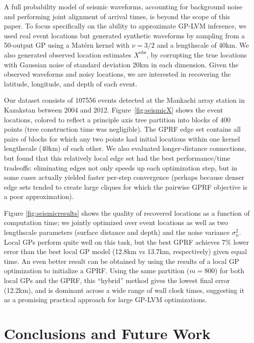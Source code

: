 \documentclass{article}
\begin{document}
A full probability model of seismic waveforms, accounting for background
noise and performing joint alignment of arrival times, is beyond the scope of this
paper. To focus specifically on the ability to approximate GP-LVM inference, we
used real event locations but generated synthetic waveforms  by sampling from a 50-output GP using a Mat\'ern kernel
\cite{rasmussen2006} with $\nu=3/2$ and a lengthscale of 40km. We also
generated observed location estimates $X^\text{obs}$, by corrupting the
true locations with Gaussian noise of standard deviation
20km in each dimension. Given the
observed waveforms and noisy locations, we are interested in recovering the
latitude, longitude, and depth of each event.

Our dataset consists of 107556 events detected at the Mankachi array
station in Kazakstan between 2004 and 2012. Figure~\ref{fig:seismicX}
shows the event locations, colored to reflect a principle axis tree
\cite{mcnames2001fast} partition into blocks of $400$ points (tree construction time was
negligible). The GPRF edge set contains all pairs of
blocks for which any two points had initial locations within one
kernel lengthscale (40km) of each other. We also evaluated
longer-distance connections, but found that this relatively local
edge set had the best performance/time tradeoffs: eliminating edges not
only speeds up each optimization step, but in some cases actually
yielded faster per-step convergence (perhaps because denser edge sets
tended to create large cliques for which the pairwise GPRF objective is
a poor approximation).

Figure \ref{fig:seismicresults} shows the quality of recovered locations as a
function of computation time; we jointly optimized over event locations as
well as two lengthscale parameters (surface distance
and depth) and the noise variance $\sigma^2_n$. Local GPs 
perform quite well on this task, but the best
GPRF achieves 7\% lower error than the best local
GP model (12.8km vs 13.7km, respectively) given equal time. An even
better result can be obtained by using the results of a local GP
optimization to initialize a GPRF. Using the same
partition ($m=800$) for both local GPs and the GPRF, this ``hybrid'' method
gives the lowest final error (12.2km), and is dominant across a wide
range of wall clock times, suggesting it as a promising
practical approach for large GP-LVM optimizations. 

\section{Conclusions and Future Work}
\end{document}
